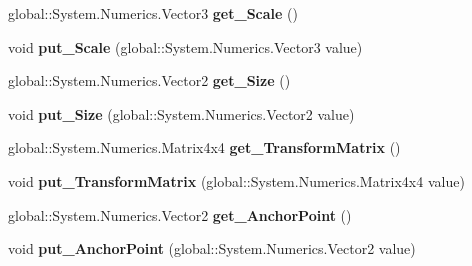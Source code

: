 \begin{DoxyCompactItemize}
\mbox{\label{interface_windows_1_1_u_i_1_1_composition_1_1_i_visual_abbebc4f788f7f54a21dae7aff127d8c8}} 
global\+::\+System.\+Numerics.\+Vector3 {\bfseries get\+\_\+\+Scale} ()
\item 
\mbox{\label{interface_windows_1_1_u_i_1_1_composition_1_1_i_visual_a3b8c0e5a8bb5705d5f952699938353d2}} 
void {\bfseries put\+\_\+\+Scale} (global\+::\+System.\+Numerics.\+Vector3 value)
\item 
\mbox{\label{interface_windows_1_1_u_i_1_1_composition_1_1_i_visual_a4fd65ed5e372f54009fa859d80730483}} 
global\+::\+System.\+Numerics.\+Vector2 {\bfseries get\+\_\+\+Size} ()
\item 
\mbox{\label{interface_windows_1_1_u_i_1_1_composition_1_1_i_visual_a40381fd8b9d0a94c741b895b7e107cc7}} 
void {\bfseries put\+\_\+\+Size} (global\+::\+System.\+Numerics.\+Vector2 value)
\item 
\mbox{\label{interface_windows_1_1_u_i_1_1_composition_1_1_i_visual_ab7a1f90666dae73a006fb9ff5e2943fc}} 
global\+::\+System.\+Numerics.\+Matrix4x4 {\bfseries get\+\_\+\+Transform\+Matrix} ()
\item 
\mbox{\label{interface_windows_1_1_u_i_1_1_composition_1_1_i_visual_a74c1e3422a186d04eb48fb2921e293e4}} 
void {\bfseries put\+\_\+\+Transform\+Matrix} (global\+::\+System.\+Numerics.\+Matrix4x4 value)
\item 
\mbox{\label{interface_windows_1_1_u_i_1_1_composition_1_1_i_visual_a5954807f57ab0fb2f59d4ab8f73a2faa}} 
global\+::\+System.\+Numerics.\+Vector2 {\bfseries get\+\_\+\+Anchor\+Point} ()
\item 
\mbox{\label{interface_windows_1_1_u_i_1_1_composition_1_1_i_visual_a2a44f2ada8b97071f0b6b3139bf1aaae}} 
void {\bfseries put\+\_\+\+Anchor\+Point} (global\+::\+System.\+Numerics.\+Vector2 value)

\end{DoxyCompactItemize}
